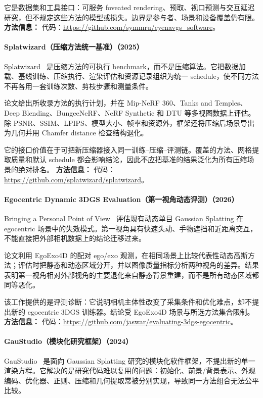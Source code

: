 它是数据集和工具接口：可服务 foveated rendering、预取、视口预测与交互延迟研究，但不规定这些方法的模型或损失。边界是参与者、场景和设备覆盖仍有限。
\textbf{方法信息：} 代码：\url{https://github.com/symmru/eyenavgs_software}。
\paragraph{Splatwizard（压缩方法统一基准）（2025）}
Splatwizard~\cite{2512_24742} 是压缩方法的可执行 benchmark，而不是压缩算法。它把数据加载、基线训练、压缩执行、渲染评估和资源记录组织为统一 schedule，使不同方法不再各用一套训练次数、剪枝步骤和测量条件。

论文给出所收录方法的执行计划，并在 Mip-NeRF 360、Tanks and Temples、Deep Blending、BungeeNeRF、NeRF Synthetic 和 DTU 等多视图数据上评估。除 PSNR、SSIM、LPIPS、模型大小、帧率和资源外，框架还将压缩后场景导出为几何并用 Chamfer distance 检查结构退化。

它的接口价值在于可把新压缩器接入同一训练--压缩--评测链。覆盖的方法、网格提取质量和默认 schedule 都会影响结论，因此不应把基准的结果泛化为所有压缩场景的绝对排名。
\textbf{方法信息：} 代码：\url{https://github.com/splatwizard/splatwizard}。
\paragraph{Egocentric Dynamic 3DGS Evaluation（第一视角动态评测）（2026）}
Bringing a Personal Point of View~\cite{2604_23803} 评估现有动态单目 Gaussian Splatting 在 egocentric 场景中的失效模式。第一视角具有快速头动、手物遮挡和近距离交互，不能直接把外部相机数据上的结论迁移过来。

论文利用 EgoExo4D 的配对 ego/exo 观测，在相同场景上比较代表性动态高斯方法；评估时把静态和动态区域分开，并以图像质量指标分析两种视角的差异。结果表明第一视角相对外部视角的主要退化来自静态背景重建，而不是所有动态区域都同等恶化。

该工作提供的是评测诊断：它说明相机主体性改变了采集条件和优化难点，却不提出新的 egocentric 3DGS 训练器。结论受 EgoExo4D 场景与所选方法集合限制。
\textbf{方法信息：} 代码：\url{https://github.com/jaswar/evaluating-3dgs-egocentric}。
\paragraph{GauStudio（模块化研究框架）（2024）}
GauStudio~\cite{2403_19632} 是面向 Gaussian Splatting 研究的模块化软件框架，不提出新的单一渲染方程。它解决的是研究代码难以复用的问题：初始化、前景/背景表示、外观编码、优化器、正则、压缩和几何提取常被分别实现，导致同一方法组合无法公平比较。

